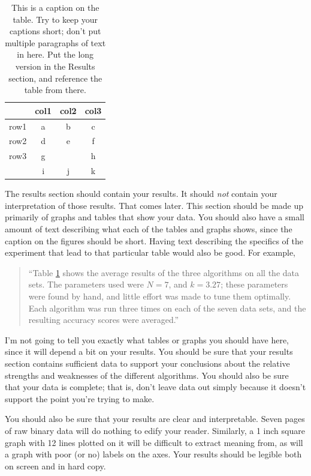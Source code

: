 \documentclass[12pt, letterpaper]{article}
\begin{document}
\begin{table}
\begin{center}
\begin{tabular}{|c||c|cc}
\hline
& col1 & col2 & col3\\
\hline \hline
row1 & a & b & c\\
\hline 
row2 & d & e & f\\
\hline 
row3 & g &   & h\\
 & i & j & k\\
\hline 
\end{tabular}
\end{center}
\caption{This is a caption on the table.  Try to keep your captions short; don't
put multiple paragraphs of text in here.  Put the long version in the Results
section, and reference the table from there.}
\label{sometable}
\end{table}

The results section should contain your results.  It should \emph{not} contain
your interpretation of those results.  That comes later.  This section should be
made up primarily of graphs and tables that show your data.  You should also
have a small amount of text describing what each of the tables and graphs shows,
since the caption on the figures should be short.  Having text describing the
specifics of the experiment that lead to that particular table would also be
good.  For example,

\begin{quote}
``Table \ref{sometable} shows the average results of the three algorithms on all
the data sets.  The parameters used were $N=7$, and $k=3.27$; these parameters
were found by hand, and little effort was made to tune them optimally.  Each
algorithm was run three times on each of the seven data sets, and the resulting
accuracy scores were averaged.''
\end{quote}

I'm not going to tell you exactly what tables or graphs you should have here,
since it will depend a bit on your results.  You should be sure that your
results section contains sufficient data to support your conclusions about the
relative strengths and weaknesses of the different algorithms.  You should also
be sure that your data is complete; that is, don't leave data out simply because
it doesn't support the point you're trying to make.

You should also be sure that your results are clear and interpretable.  Seven
pages of raw binary data will do nothing to edify your reader.  Similarly, a
1 inch square graph with 12 lines plotted on it will be difficult to extract
meaning from, as will a graph with poor (or no) labels on the axes.  Your
results should be legible both on screen and in hard copy.
\end{document}
